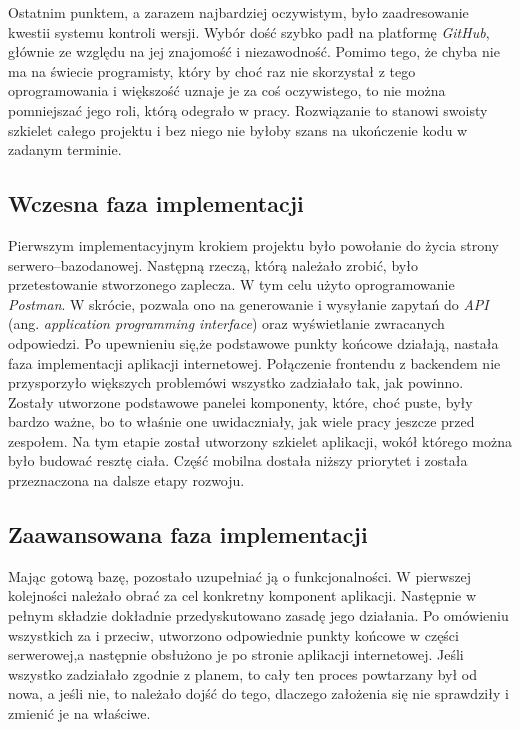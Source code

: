 \documentclass[twoside]{projektInzynierskiMS}
\numberwithin{figure}{section}
\begin{document}
Ostatnim punktem, a zarazem najbardziej oczywistym, było zaadresowanie kwestii systemu kontroli wersji. Wybór dość szybko padł na platformę \textit{GitHub}, głównie ze względu na jej znajomość i niezawodność. Pomimo tego, że chyba nie ma na świecie programisty, który by choć raz nie skorzystał z tego oprogramowania \linebreak i większość uznaje je za coś oczywistego, to nie można pomniejszać jego roli, którą odegrało w pracy. Rozwiązanie to stanowi swoisty szkielet całego projektu i bez niego nie byłoby szans na ukończenie kodu w zadanym terminie.
\subsection{Wczesna faza implementacji}
Pierwszym implementacyjnym krokiem projektu było powołanie do życia strony serwero–bazodanowej. Następną rzeczą, którą należało zrobić, było przetestowanie stworzonego zaplecza. W tym celu użyto oprogramowanie \textit{Postman}. W skrócie, pozwala ono na generowanie i wysyłanie zapytań do \textit{API} (ang. \textit{application programming interface}) oraz wyświetlanie zwracanych odpowiedzi. Po upewnieniu się,\linebreak że podstawowe punkty końcowe działają, nastała faza implementacji aplikacji internetowej. Połączenie frontendu z backendem nie przysporzyło większych problemów\linebreak i wszystko zadziałało tak, jak powinno. Zostały utworzone podstawowe panele\linebreak i komponenty, które, choć puste, były bardzo ważne, bo to właśnie one uwidaczniały, jak wiele pracy jeszcze przed zespołem. Na tym etapie został utworzony szkielet aplikacji, wokół którego można było budować resztę ciała. Część mobilna dostała niższy priorytet i została przeznaczona na dalsze etapy rozwoju.
\subsection{Zaawansowana faza implementacji}
Mając gotową bazę, pozostało uzupełniać ją o funkcjonalności. W pierwszej kolejności należało obrać za cel konkretny komponent aplikacji. Następnie w pełnym składzie dokładnie przedyskutowano zasadę jego działania. Po omówieniu wszystkich za i przeciw, utworzono odpowiednie punkty końcowe w części serwerowej,\linebreak a następnie obsłużono je po stronie aplikacji internetowej. Jeśli wszystko zadziałało zgodnie z planem, to cały ten proces powtarzany był od nowa, a jeśli nie, to należało dojść do tego, dlaczego założenia się nie sprawdziły i zmienić je na właściwe.
\end{document}
